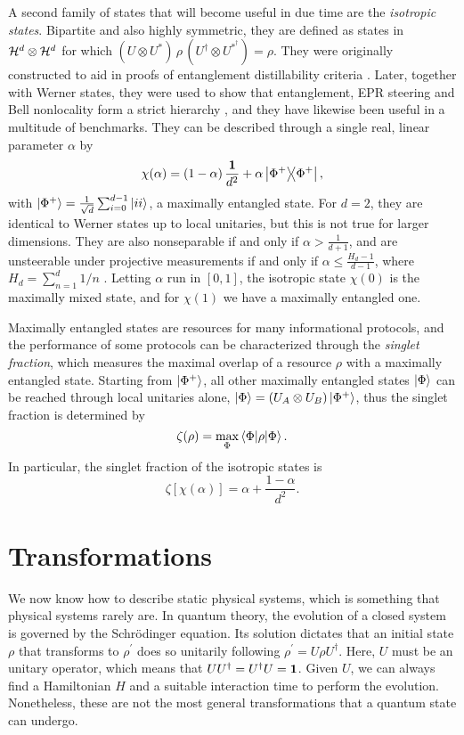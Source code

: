 		A second family of states that will become useful in due time are the \emph{isotropic states}. Bipartite and also highly symmetric, they are defined as states in $\mathcal{H}^{d} \otimes \mathcal{H}^{d}$ for which $(U \otimes U^*) \,\rho\, (U^\dagger \otimes U^{*^\dagger}) = \rho$. They were originally constructed to aid in proofs of entanglement distillability criteria \cite{horodecki_1999_isotropic}. Later, together with Werner states, they were used to show that entanglement, EPR steering and Bell nonlocality form a strict hierarchy \cite{wiseman_2007_steering,quintino_2015_inequivalence}, and they have likewise been useful in a multitude of benchmarks. They can be described through a single real, linear parameter $\alpha$ by
		$$
			\chi(\alpha) = \left(1 - \alpha\right) \frac{\mathbf{1}}{d^2} + \alpha \ketbra{\Phi^+}{\Phi^+} ,
		$$
		with $\ket{\Phi^+} = \frac{1}{\sqrt{d}} \sum_{i = 0}^{d - 1} \ket{ii}$, a maximally entangled state. For $d = 2$, they are identical to Werner states up to local unitaries, but this is not true for larger dimensions. They are also nonseparable if and only if $\alpha > \frac{1}{d+1}$, and are unsteerable under projective measurements if and only if $\alpha \leq \frac{H_d - 1}{d-1}$, where $H_d = \sum_{n=1}^d 1/n$ \cite{wiseman_2007_steering}. Letting $\alpha$ run in $[0,1]$, the isotropic state $\chi(0)$ is the maximally mixed state, and for $\chi(1)$ we have a maximally entangled one.
	
		Maximally entangled states are resources for many informational protocols, and the performance of some protocols can be characterized through the \emph{singlet fraction}, which measures the maximal overlap of a resource $\rho$ with a maximally entangled state. Starting from $\ket{\Phi^+}$, all other maximally entangled states $\ket{\Phi}$ can be reached through local unitaries alone, $\ket{\Phi} = (U_A \otimes U_B) \ket{\Phi^+}$, thus the singlet fraction is determined by
		$$
			\zeta(\rho) = \max_\Phi \left\langle \Phi \middle\vert \rho \middle\vert \Phi \right\rangle .
		$$
		In particular, the singlet fraction of the isotropic states is
		$$
			\zeta\left[ \chi(\alpha) \right] = \alpha + \frac{1 - \alpha}{d^2} .
		$$

	\section{Transformations}

		We now know how to describe static physical systems, which is something that physical systems rarely are. In quantum theory, the evolution of a closed system is governed by the Schrödinger equation. Its solution dictates that an initial state $\rho$ that transforms to $\rho^\prime$ does so unitarily following $\rho^\prime = U \rho U^\dagger$. Here, $U$ must be an unitary operator, which means that $UU^\dagger = U^\dagger U = \mathbf{1}$. Given $U$, we can always find a Hamiltonian $H$ and a suitable interaction time to perform the evolution. Nonetheless, these are not the most general transformations that a quantum state can undergo.
		
